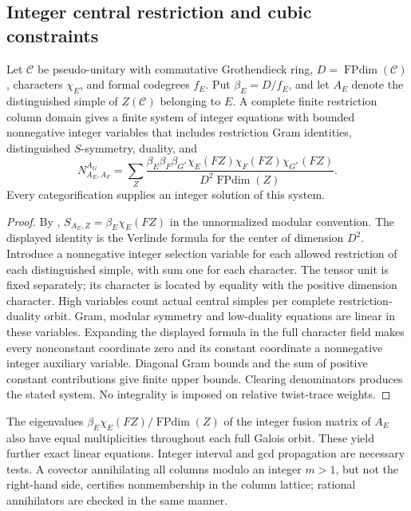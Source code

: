 \subsection{Integer central restriction and cubic constraints}
\begin{proposition}
Let $\mathcal C$ be pseudo-unitary with commutative Grothendieck ring,
$D=\operatorname{FPdim}(\mathcal C)$, characters $\chi_E$, and formal
codegrees $f_E$. Put $\beta_E=D/f_E$, and let $A_E$ denote the distinguished
simple of $Z(\mathcal C)$ belonging to $E$. A complete finite restriction
column domain gives a finite system of integer equations with bounded
nonnegative integer variables that includes restriction Gram identities,
distinguished $S$-symmetry, duality, and
\[
 N_{A_E,A_F}^{A_G}
 =\sum_Z\frac{\beta_E\beta_F\beta_{G^*}
 \chi_E(FZ)\chi_F(FZ)\chi_{G^*}(FZ)}{D^2\operatorname{FPdim}(Z)}.
\]
Every categorification supplies an integer solution of this system.
\end{proposition}
\begin{proof}
By \cite[Lemma~4.3 and Corollary~4.5]{DeshpandeCenter},
$S_{A_E,Z}=\beta_E\chi_E(FZ)$ in the unnormalized modular convention.
The displayed identity is the Verlinde formula for the center of dimension
$D^2$. Introduce a nonnegative integer selection variable for each allowed
restriction of each distinguished simple, with sum one for each character.
The tensor unit is fixed separately; its character is located by equality
with the positive dimension character. High variables count actual central
simples per complete restriction-duality orbit. Gram, modular symmetry and
low-duality equations are linear in these variables. Expanding the displayed
formula in the full character field makes every nonconstant coordinate zero
and its constant coordinate a nonnegative integer auxiliary variable.
Diagonal Gram bounds and the sum of positive constant contributions give
finite upper bounds. Clearing denominators produces the stated system.
No integrality is imposed on relative twist-trace weights.
\end{proof}
The eigenvalues $\beta_E\chi_E(FZ)/\operatorname{FPdim}(Z)$ of the integer
fusion matrix of $A_E$ also have equal multiplicities throughout each full
Galois orbit. These yield further exact linear equations. Integer interval
and gcd propagation are necessary tests. A covector annihilating all columns
modulo an integer $m>1$, but not the right-hand side, certifies nonmembership
in the column lattice; rational annihilators are checked in the same manner.
